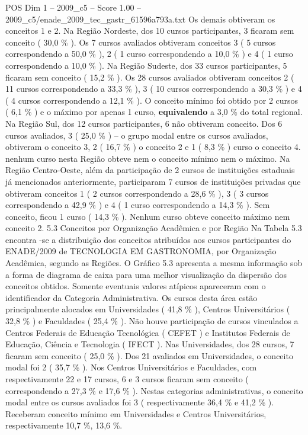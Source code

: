 \begin{textsample}{POS Dim 1 – 2009\_c5 – Score 1.00 – 2009\_c5/enade\_2009\_tec\_gastr\_61596a793a.txt}
Os demais obtiveram os conceitos 1 e 2.
Na Região Nordeste, dos 10 cursos participantes, 3 ficaram sem conceito ( 30,0 \% ).
Os 7 cursos avaliados obtiveram conceitos 3 ( 5 cursos correspondendo a 50,0 \% ), 2 ( 1 curso correspondendo a 10,0 \% ) e 4 ( 1 curso correspondendo a 10,0 \% ).
Na Região Sudeste, dos 33 cursos participantes, 5 ficaram sem conceito ( 15,2 \% ).
Os 28 cursos avaliados obtiveram conceitos 2 ( 11 cursos correspondendo a 33,3 \% ), 3 ( 10 cursos correspondendo a 30,3 \% ) e 4 ( 4 cursos correspondendo a 12,1 \% ).
O conceito mínimo foi obtido por 2 cursos ( 6,1 \% ) e o máximo por apenas 1 curso, \textbf{equivalendo} a 3,0 \% do total regional.
Na Região Sul, dos 12 cursos participantes, 6 não obtiveram conceito.
Dos 6 cursos avaliados, 3 ( 25,0 \% ) – o grupo modal entre os cursos avaliados, obtiveram o conceito 3, 2 ( 16,7 \% ) o conceito 2 e 1 ( 8,3 \% ) curso o conceito 4. nenhum curso nesta Região obteve nem o conceito mínimo nem o máximo.
Na Região Centro-Oeste, além da participação de 2 cursos de instituições estaduais já mencionados anteriormente, participaram 7 cursos de instituições privadas que obtiveram conceitos 1 ( 2 cursos correspondendo a 28,6 \% ), 3 ( 3 cursos correspondendo a 42,9 \% ) e 4 ( 1 curso correspondendo a 14,3 \% ).
Sem conceito, ficou 1 curso ( 14,3 \% ).
Nenhum curso obteve conceito máximo nem conceito 2. 5.3 Conceitos por Organização Acadêmica e por Região Na Tabela 5.3 encontra -se a distribuição dos conceitos atribuídos aos cursos participantes do ENADE/2009 de TECNOLOGIA EM GASTRONOMIA, por Organização Acadêmica, segundo as Regiões.
O Gráfico 5.3 apresenta a mesma informação sob a forma de diagrama de caixa para uma melhor visualização da dispersão dos conceitos obtidos.
Somente eventuais valores atípicos apareceram com o identificador da Categoria Administrativa.
Os cursos desta área estão principalmente alocados em Universidades ( 41,8 \% ), Centros Universitários ( 32,8 \% ) e Faculdades ( 25,4 \% ).
Não houve participação de cursos vinculados a Centros Federais de Educação Tecnológica ( CEFET ) e Institutos Federais de Educação, Ciência e Tecnologia ( IFECT ).
Nas Universidades, dos 28 cursos, 7 ficaram sem conceito ( 25,0 \% ).
Dos 21 avaliados em Universidades, o conceito modal foi 2 ( 35,7 \% ).
Nos Centros Universitários e Faculdades, com respectivamente 22 e 17 cursos, 6 e 3 cursos ficaram sem conceito ( correspondendo a 27,3 \% e 17,6 \% ).
Nestas categorias administrativas, o conceito modal entre os cursos avaliados foi 3 ( respectivamente 36,4 \% e 41,2 \% ).
Receberam conceito mínimo em Universidades e Centros Universitários, respectivamente 10,7 \%, 13,6 \%.

\end{textsample}

